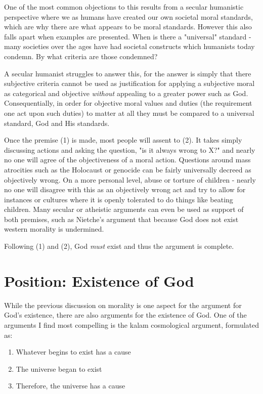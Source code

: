 \documentclass[12pt]{turabian-researchpaper}
\begin{document}
One of the most common objections to this results from a secular humanistic perspective where we as humans have created our own societal moral standards, which are why there are what appears to be moral standards. However this also falls apart when examples are presented. When is there a "universal" standard - many societies over the ages have had societal constructs which humanists today condemn. By what criteria are those condemned? 

A secular humanist struggles to answer this, for the answer is simply that there subjective criteria cannot be used as justification for applying a subjective moral as categorical and objective \textit{without} appealing to a greater power such as God. Consequentially, in order for objective moral values and duties (the requirement one act upon such duties) to matter at all they must be compared to a universal standard, God and His standards.

Once the premise (1) is made, most people will assent to (2). It takes simply discussing actions and asking the question, "is it always wrong to X?" and nearly no one will agree of the objectiveness of a moral action. Questions around mass atrocities such as the Holocaust or genocide can be fairly universally decreed as objectively wrong. On a more personal level, abuse or torture of children - nearly no one will disagree with this as an objectively wrong act and try to allow for instances or cultures where it is openly tolerated to do things like beating children. Many secular or atheistic arguments can even be used as support of both premises, such as Nietche's argument that because God does not exist western morality is undermined. \autocite{evans2014}

Following (1) and (2), God \textit{must} exist and thus the argument is complete.

\section{Position: Existence of God}

While the previous discussion on morality is one aspect for the argument for God's existence, there are also arguments for the existence of God. One of the arguments I find most compelling is the kalam cosmological argument, formulated as:\autocite[pg.111]{craig2008reasonable}

\begin{enumerate}
\item Whatever begins to exist has a cause
\item The universe began to exist
\item Therefore, the universe has a cause
\end{enumerate}
\end{document}
